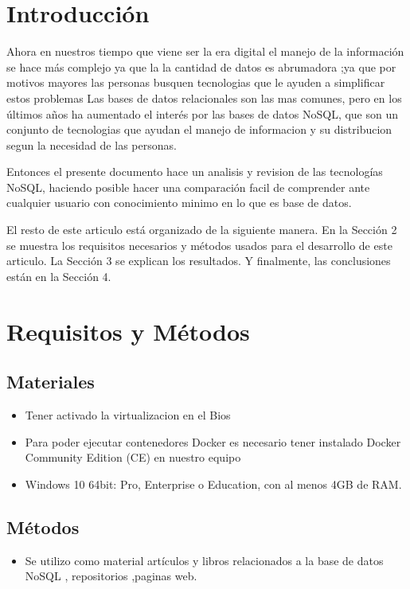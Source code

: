 \documentclass[%
 reprint,
 amsmath,amssymb,
 aps,
]{revtex4-1}
\begin{document}

\section {Introducción}\label{sec:1}

Ahora en nuestros tiempo que viene ser la era digital  el  manejo de la información se hace más complejo ya que la la cantidad de datos es abrumadora ;ya que por motivos mayores las personas busquen tecnologias que le ayuden a simplificar estos problemas  Las bases de datos relacionales son las mas comunes, pero en los últimos años ha aumentado el interés por las bases de datos NoSQL, que son un conjunto de tecnologias que ayudan el manejo de informacion y su distribucion segun la necesidad de las personas.
\par Entonces el presente documento hace un analisis y revision  de las tecnologías NoSQL, haciendo posible hacer una comparación facil de comprender ante cualquier usuario con conocimiento minimo en lo que es base de datos.\\

\par El resto de este articulo está organizado de la siguiente manera. En la Sección 2 se muestra los requisitos necesarios  y métodos usados para el desarrollo de este articulo. La Sección 3 se explican los resultados. Y finalmente, las conclusiones están en la Sección 4.



\section{Requisitos y Métodos}\label{sec:2}
\subsection{Materiales}
	\begin{itemize}
		\item Tener activado la virtualizacion en el Bios
		\item Para poder ejecutar contenedores Docker es necesario tener instalado Docker Community Edition (CE) en nuestro equipo
		\item Windows 10 64bit: Pro, Enterprise o Education, con al menos 4GB de RAM.
	\end{itemize}
\subsection{Métodos}
	\begin{itemize}
		\item Se utilizo como material artículos y libros relacionados a la base de datos NoSQL , repositorios ,paginas web.
	\end{itemize}
\end{document}
